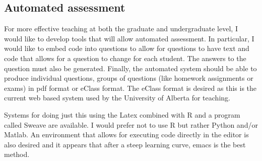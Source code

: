 \documentclass[12pt]{article}
\begin{document}
\subsection{Automated assessment}

For more effective teaching at both the graduate and undergraduate level, I would like to develop tools that will allow automated assessment. In particular, I would like to embed code into questions to allow for questions to have text and code that allows for a question to change for each student. The answers to the question must also be generated. Finally, the automated system should be able to produce individual questions, groups of questions (like homework assignments or exams) in pdf format or eClass format. The eClass format is desired as this is the current web based system used by the University of Alberta for teaching.

Systems for doing just this using the Latex combined with R and a program called Sweave are available. I would prefer not to use R but rather Python and/or Matlab. An environment that allows for executing code directly in the editor is also desired and it appears that after a steep learning curve, emacs is the best method.
\end{document}
